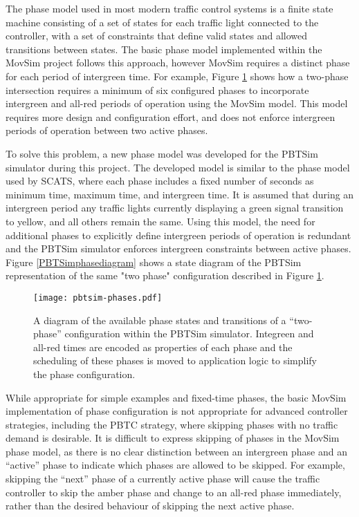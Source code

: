 The phase model used in most modern traffic control systems is a finite state machine consisting of a set of states for each traffic light connected to the controller, with a set of constraints that define valid states and allowed transitions between states. The basic phase model implemented within the MovSim project follows this approach, however MovSim requires a distinct phase for each period of intergreen time. For example, Figure \ref{movsimphasediagram} shows how a two-phase intersection requires a minimum of six configured phases to incorporate intergreen and all-red periods of operation using the MovSim model. This model requires more design and configuration effort, and does not enforce intergreen periods of operation between two active phases.

To solve this problem, a new phase model was developed for the PBTSim simulator during this project. The developed model is similar to the phase model used by SCATS, where each phase includes a fixed number of seconds as minimum time, maximum time, and intergreen time. It is assumed that during an intergreen period any traffic lights currently displaying a green signal transition to yellow, and all others remain the same. Using this model, the need for additional phases to explicitly define intergreen periods of operation is redundant and the PBTSim simulator enforces intergreen constraints between active phases. Figure \ref{PBTSimphasediagram} shows a state diagram of the PBTSim representation of the same "two phase" configuration described in Figure \ref{movsimphasediagram}.

\begin{figure}[]
\centering
	\texttt{[image: pbtsim-phases.pdf]}
	\caption[A diagram of a set of phase states for a two-phase intersection within the PBTSim simulator.]{ A diagram of the available phase states and transitions of a ``two-phase'' configuration within the PBTSim simulator. Integreen and all-red times are encoded as properties of each phase and the scheduling of these phases is moved to application logic to simplify the phase configuration. }
\label{movsimphasediagram}
\end{figure}

While appropriate for simple examples and fixed-time phases, the basic MovSim implementation of phase configuration is not appropriate for advanced controller strategies, including the PBTC strategy, where skipping phases with no traffic demand is desirable. It is difficult to express skipping of phases in the MovSim phase model, as there is no clear distinction between an intergreen phase and an ``active'' phase to indicate which phases are allowed to be skipped. For example, skipping the ``next'' phase of a currently active phase will cause the traffic controller to skip the amber phase and change to an all-red phase immediately, rather than the desired behaviour of skipping the next active phase.

